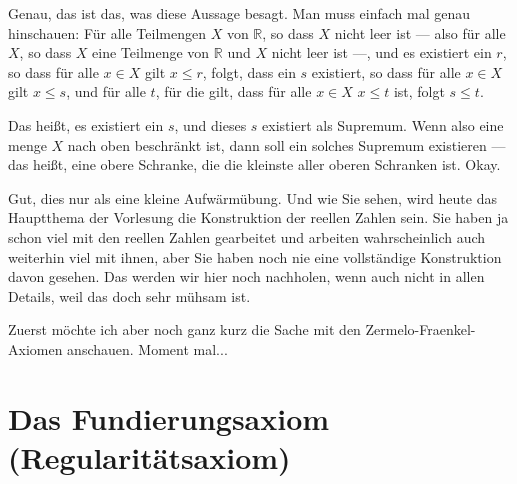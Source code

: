 \begin{spoken-clean}[00:01:43 - 00:03:45]
Genau, das ist das, was diese Aussage besagt. Man muss einfach mal genau hinschauen: Für alle Teilmengen $X$ von $\mathbb{R}$, so dass $X$ nicht leer ist --- also für alle $X$, so dass $X$ eine Teilmenge von $\mathbb{R}$ und $X$ nicht leer ist ---, und es existiert ein $r$, so dass für alle $x \in X$ gilt $x \le r$, folgt, dass ein $s$ existiert, so dass für alle $x \in X$ gilt $x \le s$, und für alle $t$, für die gilt, dass für alle $x \in X$ $x \le t$ ist, folgt $s \le t$.

Das heißt, es existiert ein $s$, und dieses $s$ existiert als Supremum. Wenn also eine menge $X$ nach oben beschränkt ist, dann soll ein solches Supremum existieren --- das heißt, eine obere Schranke, die die kleinste aller oberen Schranken ist. Okay.

Gut, dies nur als eine kleine Aufwärmübung. Und wie Sie sehen, wird heute das Hauptthema der Vorlesung die Konstruktion der reellen Zahlen sein. Sie haben ja schon viel mit den reellen Zahlen gearbeitet und arbeiten wahrscheinlich auch weiterhin viel mit ihnen, aber Sie haben noch nie eine vollständige Konstruktion davon gesehen. Das werden wir hier noch nachholen, wenn auch nicht in allen Details, weil das doch sehr mühsam ist.

Zuerst möchte ich aber noch ganz kurz die Sache mit den Zermelo-Fraenkel-Axiomen anschauen. Moment mal...
\end{spoken-clean}

\section{Das Fundierungsaxiom (Regularitätsaxiom)}

